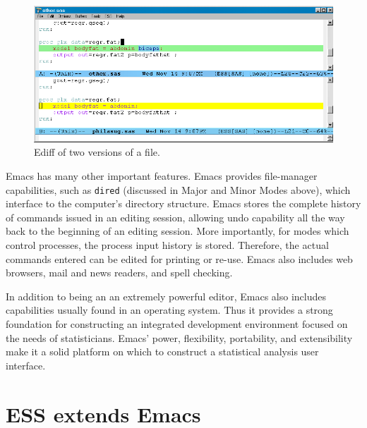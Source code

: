 \documentclass{article}
\newif\ifdraft
\newcommand*{\SAS}{\textsc{SAS}}
\newcommand{\stexttt}[1]{{\small\texttt{#1}}}
\newcommand{\emptyfig}{
\hspace*{42pt}\rule{324pt}{.25pt}\\
\hspace*{42pt}\rule{.25pt}{10pc}
\rule{316pt}{.25pt}
\rule{.25pt}{10pc}}
\begin{document}
\begin{figure}[tbp]
  \centering
  \ifdraft
     \emptyfig
  \else
     \includegraphics[angle=270,width=\textwidth]{ediff-sas}
  \fi
  \caption{Ediff of two versions of a file.}
  \label{f.ediff}
\end{figure}

Emacs has many other important features.  Emacs provides file-manager
capabilities, such as \stexttt{dired} (discussed in Major and Minor
Modes above), which interface to the computer's directory structure.
Emacs stores the complete history of commands issued in an editing
session, allowing undo capability all the way back to the beginning of an
editing session.  More importantly, for modes which control processes,
the process input history is stored.  Therefore, the actual commands
entered can be edited for printing or re-use.
Emacs also includes web browsers, mail and news readers, 
and spell checking.

In addition to being an an extremely powerful editor, Emacs also
includes capabilities usually found in an operating system.  Thus
it provides a strong foundation for constructing an integrated
development environment focused on the needs of
statisticians.  Emacs' power, flexibility, portability, and
extensibility make it a solid platform on which to construct a
statistical analysis user interface.

\section{ESS extends Emacs}
\label{sec:ess-extends-emacs}
\end{document}
